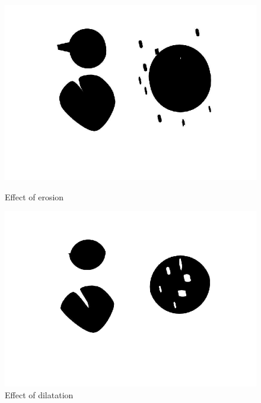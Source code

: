 \begin{figure}[H]
	\centering
	\begin{minipage}[t]{0.4\textwidth}
		\includegraphics[width=\textwidth]{images/images1eroded.png}
		\caption{Effect of erosion}
		\label{fig:images1eroded}
	\end{minipage}
	\begin{minipage}[t]{0.4\textwidth}
		\includegraphics[width=\textwidth]{images/images1dilated.png}
		\caption{Effect of dilatation}
		\label{fig:images1dilated}
	\end{minipage}
\end{figure}

